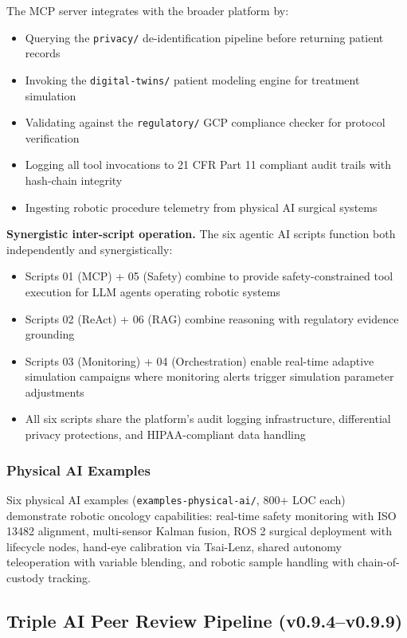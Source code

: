 The MCP server integrates with the broader platform by:
\begin{itemize}
  \item Querying the \texttt{privacy/} de-identification pipeline before returning patient records
  \item Invoking the \texttt{digital-twins/} patient modeling engine for treatment simulation
  \item Validating against the \texttt{regulatory/} GCP compliance checker for protocol verification
  \item Logging all tool invocations to 21 CFR Part 11 compliant audit trails with hash-chain integrity
  \item Ingesting robotic procedure telemetry from physical AI surgical systems
\end{itemize}

\textbf{Synergistic inter-script operation.} The six agentic AI scripts function both independently and synergistically:
\begin{itemize}
  \item Scripts 01 (MCP) + 05 (Safety) combine to provide safety-constrained tool execution for LLM agents operating robotic systems
  \item Scripts 02 (ReAct) + 06 (RAG) combine reasoning with regulatory evidence grounding
  \item Scripts 03 (Monitoring) + 04 (Orchestration) enable real-time adaptive simulation campaigns where monitoring alerts trigger simulation parameter adjustments
  \item All six scripts share the platform's audit logging infrastructure, differential privacy protections, and HIPAA-compliant data handling
\end{itemize}

\subsubsection{Physical AI Examples}

Six physical AI examples (\texttt{examples-physical-ai/}, 800+ LOC each) demonstrate robotic oncology capabilities: real-time safety monitoring with ISO 13482 alignment, multi-sensor Kalman fusion, ROS 2 surgical deployment with lifecycle nodes, hand-eye calibration via Tsai-Lenz, shared autonomy teleoperation with variable blending, and robotic sample handling with chain-of-custody tracking.

\subsection{Triple AI Peer Review Pipeline (v0.9.4--v0.9.9)}
\label{sec:peerreview}

